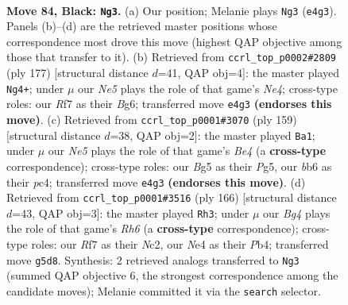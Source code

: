 \documentclass[11pt]{article}
\begin{document}
\clearpage

\begin{figure}[p]\centering
\begin{subfigure}{0.46\textwidth}\centering
\resizebox{\linewidth}{!}{%
\newchessgame
\chessboard[
  setfen={8/5r2/1B2k2p/3pp1b1/K3n2p/8/1R6/8 b - - 3 84},
  showmover=false,
  pgfstyle=straightmove, color=movearrow, markmove={e4-g3}
]}
\caption{}
\end{subfigure}\hfill
\begin{subfigure}{0.46\textwidth}\centering
\resizebox{\linewidth}{!}{%
\newchessgame
\chessboard[
  setfen={8/R7/4pkb1/2P1n1p1/B7/4K3/8/8 b - - 14 89},
  showmover=false,
  pgfstyle=straightmove, color=movearrow, markmove={e5-g4}
]}
\caption{}
\end{subfigure}
\\[4pt]
\begin{subfigure}{0.46\textwidth}\centering
\resizebox{\linewidth}{!}{%
\newchessgame
\chessboard[
  setfen={8/1R5P/3pk3/4b1p1/K1P2p2/8/P7/8 b - - 0 80},
  showmover=false,
  pgfstyle=straightmove, color=movearrow, markmove={e5-a1}
]}
\caption{}
\end{subfigure}\hfill
\begin{subfigure}{0.46\textwidth}\centering
\resizebox{\linewidth}{!}{%
\newchessgame
\chessboard[
  setfen={8/1k6/7R/1p4r1/1P6/2P5/1KN5/6b1 w - - 77 84},
  showmover=false,
  pgfstyle=straightmove, color=movearrow, markmove={h6-h3}
]}
\caption{}
\end{subfigure}
\caption{\textbf{Move 84, Black: \texttt{Ng3}.} (a) Our position; Melanie plays \texttt{Ng3} (\texttt{e4g3}). Panels (b)--(d) are the retrieved master positions whose correspondence most drove this move (highest QAP objective among those that transfer to it). (b) Retrieved from \texttt{ccrl\_top\_p0002\#2809} (ply 177) [structural distance $d$=41, QAP obj=4]: the master played \texttt{Ng4+}; under $\mu$ our \emph{Ne5} plays the role of that game's \emph{Ne4}; cross-type roles: our \emph{R}f7 as their \emph{B}g6; transferred move \texttt{e4g3} \textbf{(endorses this move)}. (c) Retrieved from \texttt{ccrl\_top\_p0001\#3070} (ply 159) [structural distance $d$=38, QAP obj=2]: the master played \texttt{Ba1}; under $\mu$ our \emph{Ne5} plays the role of that game's \emph{Be4} (a \textbf{cross-type} correspondence); cross-type roles: our \emph{B}g5 as their \emph{P}g5, our \emph{b}b6 as their \emph{p}c4; transferred move \texttt{e4g3} \textbf{(endorses this move)}. (d) Retrieved from \texttt{ccrl\_top\_p0001\#3516} (ply 166) [structural distance $d$=43, QAP obj=3]: the master played \texttt{Rh3}; under $\mu$ our \emph{Bg4} plays the role of that game's \emph{Rh6} (a \textbf{cross-type} correspondence); cross-type roles: our \emph{R}f7 as their \emph{N}c2, our \emph{N}e4 as their \emph{P}b4; transferred move \texttt{g5d8}. Synthesis: 2 retrieved analogs transferred to \texttt{Ng3} (summed QAP objective 6, the strongest correspondence among the candidate moves); Melanie committed it via the \texttt{search} selector.}
\label{fig:thought-m167}
\end{figure}
\end{document}
